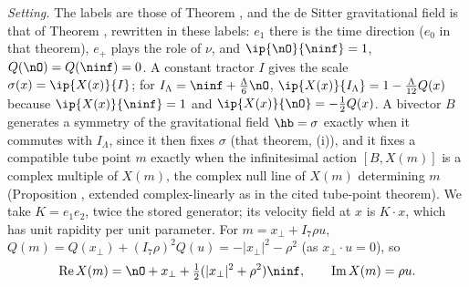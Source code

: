 \emph{Setting.} The labels are those of Theorem , and the de Sitter gravitational field is that of Theorem , rewritten in these labels: $e_{1}$ there is the time direction ($e_{0}$ in that theorem), $e_{+}$ plays the role of $\nu$, and $\ip{\nO}{\ninf} = 1$, $Q(\nO) = Q(\ninf) = 0$. A constant tractor $I$ gives the scale $\sigma(x) = \ip{X(x)}{I}$; for $I_{\Lambda} = \ninf + \tfrac{\Lambda}{6}\nO$, $\ip{X(x)}{I_{\Lambda}} = 1 - \tfrac{\Lambda}{12}Q(x)$ because $\ip{X(x)}{\ninf} = 1$ and $\ip{X(x)}{\nO} = -\tfrac12 Q(x)$. A bivector $B$ generates a symmetry of the gravitational field $\hb = \sigma$ exactly when it commutes with $I_{\Lambda}$, since it then fixes $\sigma$ (that theorem, (i)), and it fixes a compatible tube point $m$ exactly when the infinitesimal action $[B, X(m)]$ is a complex multiple of $X(m)$, the complex null line of $X(m)$ determining $m$ (Proposition , extended complex-linearly as in the cited tube-point theorem). We take $K = e_{1}e_{2}$, twice the stored generator; its velocity field at $x$ is $K \cdot x$, which has unit rapidity per unit parameter. For $m = x_{\perp} + I_{7}\rho u$, $Q(m) = Q(x_{\perp}) + (I_{7}\rho)^{2}Q(u) = -|x_{\perp}|^{2} - \rho^{2}$ (as $x_{\perp} \cdot u = 0$), so
\[
\operatorname{Re}X(m) = \nO + x_{\perp} + \tfrac12(|x_{\perp}|^{2} + \rho^{2})\ninf, \qquad \operatorname{Im}X(m) = \rho u .
\]

